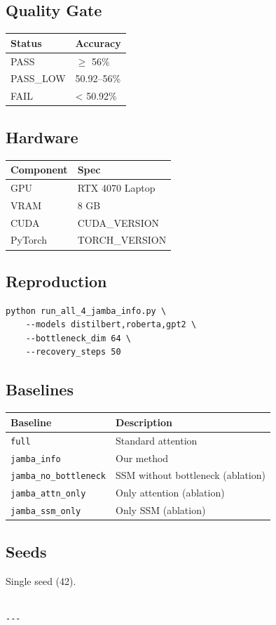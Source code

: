\subsection{Quality Gate}

\begin{table}[H]
\centering
\small
\begin{tabular}{ll}
\toprule
\textbf{Status} & \textbf{Accuracy} \\
\midrule
PASS & $\ge$ 56\% \\
PASS\_LOW & 50.92--56\% \\
FAIL & < 50.92\% \\
\bottomrule
\end{tabular}
\end{table}

\subsection{Hardware}

\begin{table}[H]
\centering
\small
\begin{tabular}{ll}
\toprule
\textbf{Component} & \textbf{Spec} \\
\midrule
GPU & RTX 4070 Laptop \\
VRAM & 8 GB \\
CUDA & {{CUDA\_VERSION}} \\
PyTorch & {{TORCH\_VERSION}} \\
\bottomrule
\end{tabular}
\end{table}

\subsection{Reproduction}

\begin{lstlisting}
python run_all_4_jamba_info.py \
    --models distilbert,roberta,gpt2 \
    --bottleneck_dim 64 \
    --recovery_steps 50
\end{lstlisting}

\subsection{Baselines}

\begin{table}[H]
\centering
\small
\begin{tabular}{ll}
\toprule
\textbf{Baseline} & \textbf{Description} \\
\midrule
\texttt{full} & Standard attention \\
\texttt{jamba\_info} & Our method \\
\texttt{jamba\_no\_bottleneck} & SSM without bottleneck (ablation) \\
\texttt{jamba\_attn\_only} & Only attention (ablation) \\
\texttt{jamba\_ssm\_only} & Only SSM (ablation) \\
\bottomrule
\end{tabular}
\end{table}

\subsection{Seeds}

Single seed (42).
\begin{lstlisting}

---
\end{lstlisting}